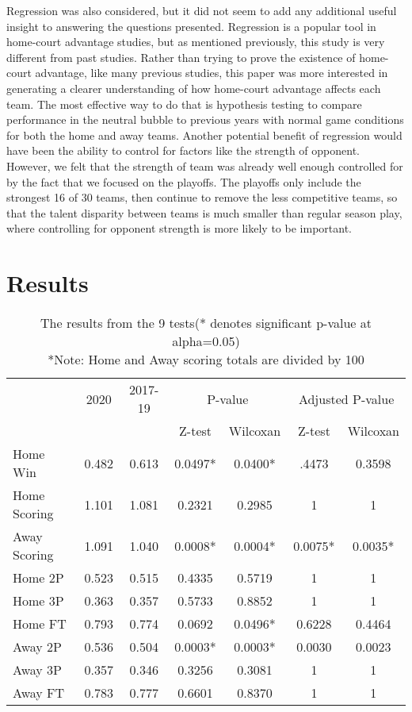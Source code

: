 \documentclass[10pt]{article}
\begin{document}
Regression was also considered, but it did not seem to add any additional 
useful insight to answering the questions presented. Regression is a popular
tool in home-court advantage studies, but as mentioned previously, this
study is very different from past studies. Rather than trying to prove the
existence of home-court advantage, like many previous studies, this paper
was more interested in generating a clearer understanding of how home-court
advantage affects each team. The most effective way to do that is hypothesis
testing to compare performance in the neutral bubble to previous years with
normal game conditions for both the home and away teams. Another potential
benefit of regression would have been the ability to control for factors
like the strength of opponent. However, we felt that the strength of team was
already well enough controlled for by the fact that we focused on the
playoffs. The playoffs only include the strongest 16 of 30 teams, then
continue to remove the less competitive teams, so that the talent disparity
between teams is much smaller than regular season play, where controlling for
opponent strength is more likely to be important.

\section{Results}
\bigskip
\begin{table}[H]
  \caption{The results from the 9 tests(* denotes significant p-value at alpha=0.05)
  \\*Note: Home and Away scoring totals are divided by 100}
  \label{tab:table}
\centering
\begin{tabular}[t]{lcccccc}
  & 2020 & 2017-19 & \multicolumn{2}{c}{P-value} & \multicolumn{2}{c}{Adjusted P-value}\\
  &          &                & Z-test & Wilcoxan & Z-test & Wilcoxan\\
Home Win & 0.482 & 0.613 & 0.0497* & 0.0400* & .4473 & 0.3598\\
Home Scoring & 1.101 & 1.081 & 0.2321 & 0.2985 & 1 & 1\\
Away Scoring & 1.091 & 1.040 & 0.0008* & 0.0004* & 0.0075* & 0.0035*\\
Home 2P & 0.523 & 0.515 & 0.4335 & 0.5719 & 1 & 1\\
Home 3P & 0.363 & 0.357 & 0.5733 & 0.8852 & 1 & 1\\
Home FT & 0.793 & 0.774 & 0.0692 & 0.0496* & 0.6228 & 0.4464\\
Away 2P & 0.536 & 0.504 & 0.0003* & 0.0003* & 0.0030 & 0.0023\\
Away 3P & 0.357 & 0.346 & 0.3256 & 0.3081 & 1 & 1\\
Away FT & 0.783 & 0.777 & 0.6601 & 0.8370 & 1 & 1\\
\end{tabular}
\end{table}
\end{document}
